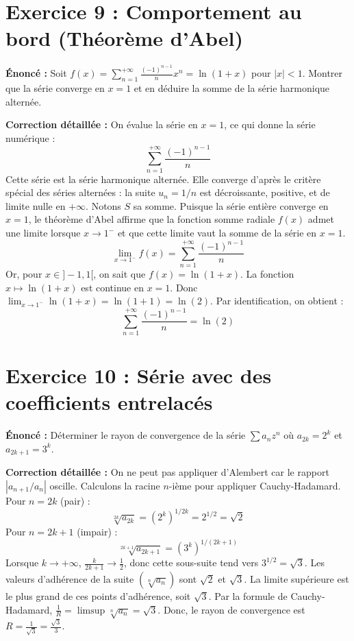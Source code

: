 \documentclass{report}
\begin{document}
\newpage
\chapter*{Exercice 9 : Comportement au bord (Théorème d'Abel)}

\textbf{Énoncé :}
Soit $f(x) = \sum_{n=1}^{+\infty} \frac{(-1)^{n-1}}{n} x^n = \ln(1+x)$ pour $|x|<1$. Montrer que la série converge en $x=1$ et en déduire la somme de la série harmonique alternée.

\textbf{Correction détaillée :}
On évalue la série en $x=1$, ce qui donne la série numérique :
$$ \sum_{n=1}^{+\infty} \frac{(-1)^{n-1}}{n} $$
Cette série est la série harmonique alternée. Elle converge d'après le critère spécial des séries alternées : la suite $u_n = 1/n$ est décroissante, positive, et de limite nulle en $+\infty$.
Notons $S$ sa somme.
Puisque la série entière converge en $x=1$, le théorème d'Abel affirme que la fonction somme radiale $f(x)$ admet une limite lorsque $x \to 1^-$ et que cette limite vaut la somme de la série en $x=1$.
$$ \lim_{x \to 1^-} f(x) = \sum_{n=1}^{+\infty} \frac{(-1)^{n-1}}{n} $$
Or, pour $x \in ]-1, 1[$, on sait que $f(x) = \ln(1+x)$.
La fonction $x \mapsto \ln(1+x)$ est continue en $x=1$.
Donc $\lim_{x \to 1^-} \ln(1+x) = \ln(1+1) = \ln(2)$.
Par identification, on obtient :
$$ \sum_{n=1}^{+\infty} \frac{(-1)^{n-1}}{n} = \ln(2) $$

\newpage
\chapter*{Exercice 10 : Série avec des coefficients entrelacés}

\textbf{Énoncé :}
Déterminer le rayon de convergence de la série $\sum a_n z^n$ où $a_{2k} = 2^k$ et $a_{2k+1} = 3^k$.

\textbf{Correction détaillée :}
On ne peut pas appliquer d'Alembert car le rapport $|a_{n+1}/a_n|$ oscille.
Calculons la racine $n$-ième pour appliquer Cauchy-Hadamard.
Pour $n = 2k$ (pair) :
$$ \sqrt[2k]{a_{2k}} = (2^k)^{1/2k} = 2^{1/2} = \sqrt{2} $$
Pour $n = 2k+1$ (impair) :
$$ \sqrt[2k+1]{a_{2k+1}} = (3^k)^{1/(2k+1)} $$
Lorsque $k \to +\infty$, $\frac{k}{2k+1} \to \frac{1}{2}$, donc cette sous-suite tend vers $3^{1/2} = \sqrt{3}$.
Les valeurs d'adhérence de la suite $(\sqrt[n]{a_n})$ sont $\sqrt{2}$ et $\sqrt{3}$.
La limite supérieure est le plus grand de ces points d'adhérence, soit $\sqrt{3}$.
Par la formule de Cauchy-Hadamard, $\frac{1}{R} = \limsup \sqrt[n]{a_n} = \sqrt{3}$.
Donc, le rayon de convergence est $R = \frac{1}{\sqrt{3}} = \frac{\sqrt{3}}{3}$.
\end{document}
